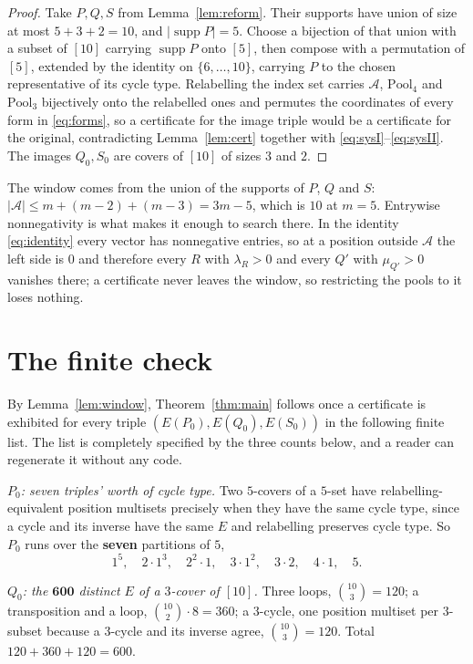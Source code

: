 \documentclass[11pt]{amsart}
\newcommand{\Ee}{E}
\newcommand{\Allowed}{\mathcal A}
\newcommand{\supp}{\operatorname{supp}}
\begin{document}
\begin{proof}
Take $P,Q,S$ from Lemma~\ref{lem:reform}. Their supports have union of size at
most $5+3+2=10$, and $|\supp P|=5$. Choose a bijection of that union with a
subset of $[10]$ carrying $\supp P$ onto $[5]$, then compose with a permutation
of $[5]$, extended by the identity on $\{6,\dots,10\}$, carrying $P$ to the
chosen representative of its cycle type. Relabelling the index set carries
$\Allowed$, $\mathrm{Pool}_4$ and $\mathrm{Pool}_3$ bijectively onto the
relabelled ones and permutes the coordinates of every form in
\eqref{eq:forms}, so a certificate for the image triple would be a certificate
for the original, contradicting Lemma~\ref{lem:cert} together with
\eqref{eq:sysI}--\eqref{eq:sysII}. The images $Q_0,S_0$ are covers of $[10]$ of
sizes $3$ and $2$.
\end{proof}

The window comes from the union of the supports of $P$, $Q$ and $S$:
$|\Allowed|\le m+(m-2)+(m-3)=3m-5$, which is $10$ at $m=5$. Entrywise
nonnegativity is what makes it enough to search there. In the identity
\eqref{eq:identity} every vector has nonnegative entries, so at a position
outside $\Allowed$ the left side is $0$ and therefore every $R$ with
$\lambda_R>0$ and every $Q'$ with $\mu_{Q'}>0$ vanishes there; a certificate
never leaves the window, so restricting the pools to it loses nothing.

\section{The finite check}

By Lemma~\ref{lem:window}, Theorem~\ref{thm:main} follows once a certificate is
exhibited for every triple $(\Ee(P_0),\Ee(Q_0),\Ee(S_0))$ in the following
finite list. The list is completely specified by the three counts below, and a
reader can regenerate it without any code.

\medskip
\noindent\emph{$P_0$: seven triples' worth of cycle type.}
Two $5$-covers of a $5$-set have relabelling-equivalent position multisets
precisely when they have the same cycle type, since a cycle and its inverse have
the same $\Ee$ and relabelling preserves cycle type. So $P_0$ runs over the
\textbf{seven} partitions of $5$,
\[
 1^5,\quad 2\cdot1^3,\quad 2^2\cdot1,\quad 3\cdot1^2,\quad 3\cdot2,
 \quad 4\cdot1,\quad 5 .
\]

\medskip
\noindent\emph{$Q_0$: the $\mathbf{600}$ distinct $\Ee$ of a $3$-cover of
$[10]$.}
Three loops, $\binom{10}{3}=120$; a transposition and a loop,
$\binom{10}{2}\cdot8=360$; a $3$-cycle, one position multiset per $3$-subset
because a $3$-cycle and its inverse agree, $\binom{10}{3}=120$. Total
$120+360+120=600$.
\end{document}
